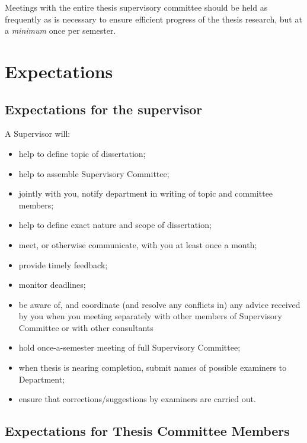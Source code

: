 \documentclass[
  openany]{book}
\providecommand{\tightlist}{%
  \setlength{\itemsep}{0pt}\setlength{\parskip}{0pt}}
\begin{document}
Meetings with the entire thesis supervisory committee should be held as frequently as is necessary to ensure efficient progress of the thesis research, but at a \emph{minimum} once per semester.

\hypertarget{expectations}{%
\section{Expectations}\label{expectations}}

\hypertarget{expectations-for-the-supervisor}{%
\subsection{Expectations for the supervisor}\label{expectations-for-the-supervisor}}

A Supervisor will:

\begin{itemize}
\tightlist
\item
  help to define topic of dissertation;
\item
  help to assemble Supervisory Committee;
\item
  jointly with you, notify department in writing of topic and committee members;
\item
  help to define exact nature and scope of dissertation;
\item
  meet, or otherwise communicate, with you at least once a month;
\item
  provide timely feedback;
\item
  monitor deadlines;
\item
  be aware of, and coordinate (and resolve any conflicts in) any advice received by you when you meeting separately with other members of Supervisory Committee or with other consultants
\item
  hold once-a-semester meeting of full Supervisory Committee;
\item
  when thesis is nearing completion, submit names of possible examiners to Department;
\item
  ensure that corrections/suggestions by examiners are carried out.
\end{itemize}

\hypertarget{expectations-for-thesis-committee-members}{%
\subsection{Expectations for Thesis Committee Members}\label{expectations-for-thesis-committee-members}}
\end{document}
